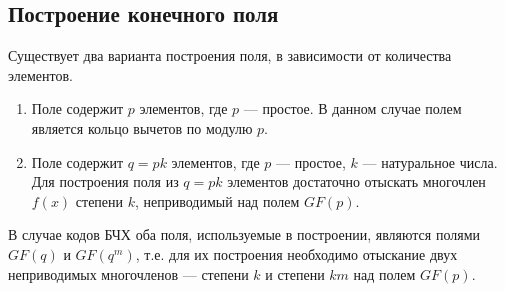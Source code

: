 \subsection{Построение конечного поля}
Существует два варианта построения поля, в зависимости от количества элементов.
\begin{enumerate}
  \item Поле содержит $p$ элементов, где $p$ --- простое. В данном случае полем является кольцо вычетов по 
модулю $p$.
  \item Поле содержит $q=pk$ элементов, где $p$ --- простое, $k$ --- натуральное числа. Для построения поля 
из $q=pk$ элементов достаточно отыскать многочлен $f(x)$ степени $k$, неприводимый над полем $GF(p)$.
\end{enumerate}
В случае кодов БЧХ оба поля, используемые в построении, являются полями $GF(q)$ и $GF(q^m)$, т.е. для их 
построения необходимо отыскание двух неприводимых многочленов --- степени $k$ и степени $km$ над полем $GF(p)$.

